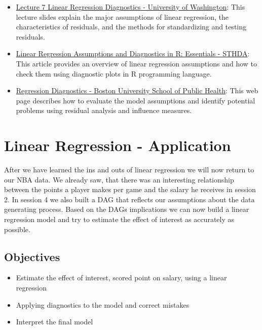 \documentclass[
]{book}
\providecommand{\tightlist}{%
  \setlength{\itemsep}{0pt}\setlength{\parskip}{0pt}}
\begin{document}
\begin{itemize}
\tightlist
\item
  \href{https://courses.washington.edu/b515/l7.pdf}{Lecture 7 Linear Regression Diagnostics - University of Washington}: This lecture slides explain the major assumptions of linear regression, the characteristics of residuals, and the methods for standardizing and testing residuals.
\item
  \href{http://sthda.com/english/articles/39-regression-model-diagnostics/161-linear-regression-assumptions-and-diagnostics-in-r-essentials}{Linear Regression Assumptions and Diagnostics in R: Essentials - STHDA}: This article provides an overview of linear regression assumptions and how to check them using diagnostic plots in R programming language.
\item
  \href{https://sphweb.bumc.bu.edu/otlt/MPH-Modules/BS/R/R5_Correlation-Regression/R5_Correlation-Regression7.html}{Regression Diagnostics - Boston University School of Public Health}: This web page describes how to evaluate the model assumptions and identify potential problems using residual analysis and influence measures.
\end{itemize}

\hypertarget{lin-a}{%
\chapter{Linear Regression - Application}\label{lin-a}}

After we have learned the ins and outs of linear regression we will now
return to our NBA data.
We already saw, that there was an interesting relationship between the
points a player makes per game and the salary he receives in session 2. In
session 4 we also built a DAG that reflects our assumptions about the data
generating process. Based on the DAGs implications we can now build a linear
regression model and try to estimate the effect of interest as accurately as
possible.

\hypertarget{objectives-6}{%
\section{Objectives}\label{objectives-6}}

\begin{itemize}
\tightlist
\item
  Estimate the effect of interest, scored point on salary, using a linear regression
\item
  Applying diagnostics to the model and correct mistakes
\item
  Interpret the final model
\end{itemize}
\end{document}
